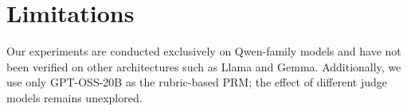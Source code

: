 \section*{Limitations}

Our experiments are conducted exclusively on Qwen-family models and have not been verified on other architectures such as Llama and Gemma. Additionally, we use only GPT-OSS-20B as the rubric-based PRM; the effect of different judge models remains unexplored.
